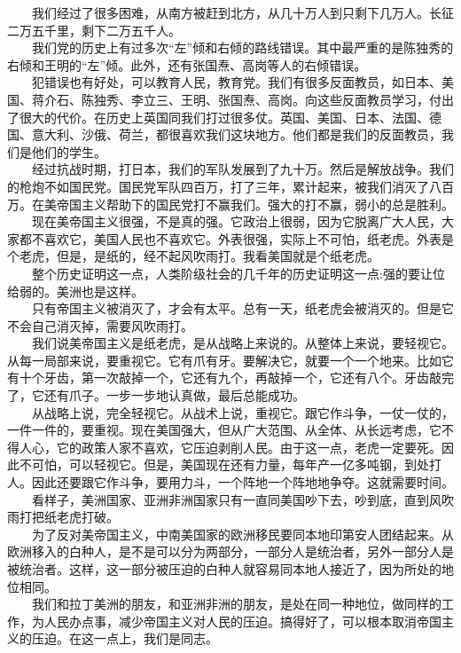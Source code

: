 \documentclass[cn,11pt,chinese]{elegantbook}
\begin{document}
　　我们经过了很多困难，从南方被赶到北方，从几十万人到只剩下几万人。长征二万五千里，剩下二万五千人。\\
　　我们党的历史上有过多次“左”倾和右倾的路线错误。其中最严重的是陈独秀的右倾和王明的“左”倾。此外，还有张国焘、高岗等人的右倾错误。\\
　　犯错误也有好处，可以教育人民，教育党。我们有很多反面教员，如日本、美国、蒋介石、陈独秀、李立三、王明、张国焘、高岗。向这些反面教员学习，付出了很大的代价。在历史上英国同我们打过很多仗。英国、美国、日本、法国、德国、意大利、沙俄、荷兰，都很喜欢我们这块地方。他们都是我们的反面教员，我们是他们的学生。\\
　　经过抗战时期，打日本，我们的军队发展到了九十万。然后是解放战争。我们的枪炮不如国民党。国民党军队四百万，打了三年，累计起来，被我们消灭了八百万。在美帝国主义帮助下的国民党打不赢我们。强大的打不赢，弱小的总是胜利。\\
　　现在美帝国主义很强，不是真的强。它政治上很弱，因为它脱离广大人民，大家都不喜欢它，美国人民也不喜欢它。外表很强，实际上不可怕，纸老虎。外表是个老虎，但是，是纸的，经不起风吹雨打。我看美国就是个纸老虎。\\
　　整个历史证明这一点，人类阶级社会的几千年的历史证明这一点:强的要让位给弱的。美洲也是这样。\\
　　只有帝国主义被消灭了，才会有太平。总有一天，纸老虎会被消灭的。但是它不会自己消灭掉，需要风吹雨打。\\
　　我们说美帝国主义是纸老虎，是从战略上来说的。从整体上来说，要轻视它。从每一局部来说，要重视它。它有爪有牙。要解决它，就要一个一个地来。比如它有十个牙齿，第一次敲掉一个，它还有九个，再敲掉一个，它还有八个。牙齿敲完了，它还有爪子。一步一步地认真做，最后总能成功。\\
　　从战略上说，完全轻视它。从战术上说，重视它。跟它作斗争，一仗一仗的，一件一件的，要重视。现在美国强大，但从广大范围、从全体、从长远考虑，它不得人心，它的政策人家不喜欢，它压迫剥削人民。由于这一点，老虎一定要死。因此不可怕，可以轻视它。但是，美国现在还有力量，每年产一亿多吨钢，到处打人。因此还要跟它作斗争，要用力斗，一个阵地一个阵地地争夺。这就需要时间。\\
　　看样子，美洲国家、亚洲非洲国家只有一直同美国吵下去，吵到底，直到风吹雨打把纸老虎打破。\\
　　为了反对美帝国主义，中南美国家的欧洲移民要同本地印第安人团结起来。从欧洲移入的白种人，是不是可以分为两部分，一部分人是统治者，另外一部分人是被统治者。这样，这一部分被压迫的白种人就容易同本地人接近了，因为所处的地位相同。\\
　　我们和拉丁美洲的朋友，和亚洲非洲的朋友，是处在同一种地位，做同样的工作，为人民办点事，减少帝国主义对人民的压迫。搞得好了，可以根本取消帝国主义的压迫。在这一点上，我们是同志。\\
\end{document}
